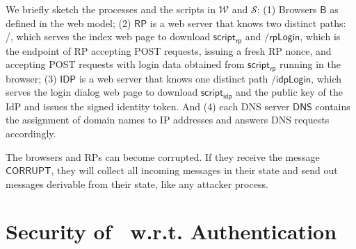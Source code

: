 We briefly sketch the processes and the scripts in $\mathcal{W}$ and $\mathcal{S}$: (1) Browsers $\mathsf{B}$ as defined in the web model; (2) $\mathsf{RP}$ is a web server that knows two distinct paths: /, which serves the index web page to download $\mathsf{script_{rp}}$ and $\mathsf{/rpLogin}$, which is the endpoint of RP accepting POST requests, issuing a fresh RP nonce, and accepting POST requests with login data obtained from $\mathsf{script_{rp}}$ running in the browser; (3) $\mathsf{IDP}$ is a web server that knows one distinct path $\mathsf{/idpLogin}$, which serves the login dialog web page to download $\mathsf{script_{idp}}$ and the public key of the IdP and issues the signed identity token. And (4) each DNS server $\mathsf{DNS}$ contains the assignment of domain names to IP addresses and answers DNS requests
accordingly. 

The browsers and RPs can become corrupted. If they receive the message $\mathsf{CORRUPT}$, they will 
collect all incoming messages in their state and send out messages derivable from their state, like any attacker process.


\section{Security of \usso\ w.r.t. Authentication}
\label{appendix-security}


